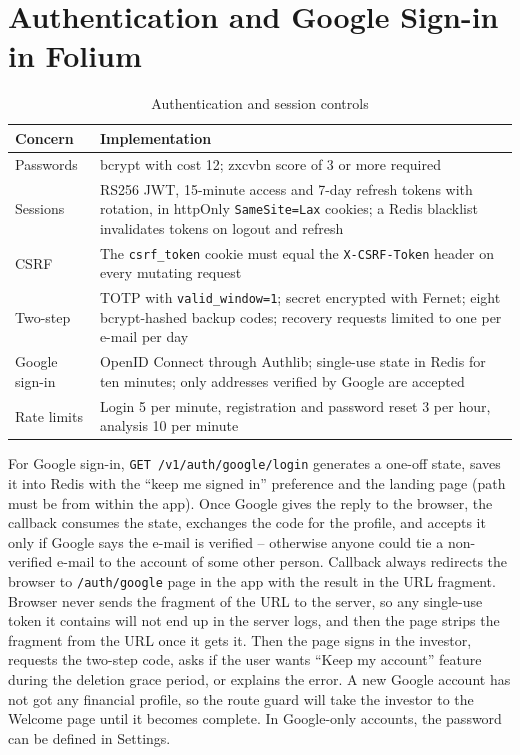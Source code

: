 \section{Authentication and Google Sign-in in Folium}
\begin{table}[H]
\centering
\small
\begin{tabularx}{\textwidth}{|P{2.6cm}|L|}
\hline
\textbf{Concern} & \textbf{Implementation} \\
\hline
Passwords & bcrypt with cost 12; zxcvbn score of 3 or more required \\
\hline
Sessions & RS256 JWT, 15-minute access and 7-day refresh tokens with rotation, in httpOnly \texttt{SameSite=Lax} cookies; a Redis blacklist invalidates tokens on logout and refresh \\
\hline
CSRF & The \texttt{csrf\_token} cookie must equal the \texttt{X-CSRF-Token} header on every mutating request \\
\hline
Two-step & TOTP with \texttt{valid\_window=1}; secret encrypted with Fernet; eight bcrypt-hashed backup codes; recovery requests limited to one per e-mail per day \\
\hline
Google sign-in & OpenID Connect through Authlib; single-use state in Redis for ten minutes; only addresses verified by Google are accepted \\
\hline
Rate limits & Login 5 per minute, registration and password reset 3 per hour, analysis 10 per minute \\
\hline
\end{tabularx}
\caption{Authentication and session controls}
\label{tab:auth}
\end{table}

For Google sign-in, \texttt{GET /v1/auth/google/login} generates a one-off state, saves it into Redis with the “keep me signed in” preference and the landing page (path must be from within the app). Once Google gives the reply to the browser, the callback consumes the state, exchanges the code for the profile, and accepts it only if Google says the e-mail is verified – otherwise anyone could tie a non-verified e-mail to the account of some other person. Callback always redirects the browser to \texttt{/auth/google} page in the app with the result in the URL fragment. Browser never sends the fragment of the URL to the server, so any single-use token it contains will not end up in the server logs, and then the page strips the fragment from the URL once it gets it. Then the page signs in the investor, requests the two-step code, asks if the user wants “Keep my account” feature during the deletion grace period, or explains the error. A new Google account has not got any financial profile, so the route guard will take the investor to the Welcome page until it becomes complete. In Google-only accounts, the password can be defined in Settings.

